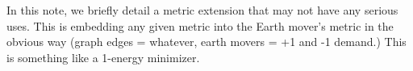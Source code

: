 

In this note, we briefly detail a metric extension that may not have any
serious uses.
This is embedding any given metric into the Earth mover's metric in the
obvious way (graph edges = whatever, earth movers = +1 and -1 demand.)
This is something like a 1-energy minimizer.

